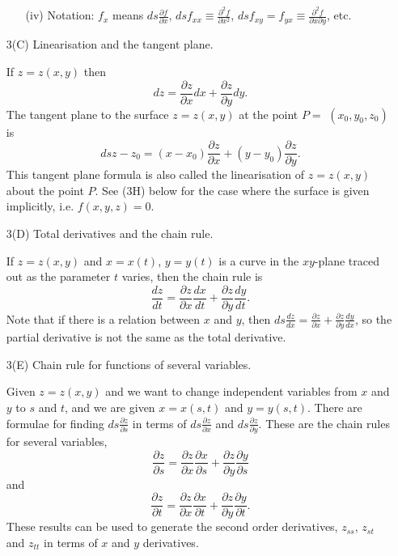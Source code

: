 \documentclass{article}
\begin{document}
\begin{enumerate}
\begin{enumerate}
\item[(iv)] Notation: $f_x$ means ${ds \frac{\partial f}{\partial x}}$,
${ds f_{xx} \equiv \frac{\partial^2 f}{\partial x^2}}$,
${ds f_{xy} = f_{yx} \equiv \frac{\partial^2 f}{\partial x \partial y}}$,
etc.

\end{enumerate}

\item[3(C)]  Linearisation and the tangent plane.

If $z= z(x,y)$ then
  $$ dz = \frac{\partial z}{\partial x} dx +
\frac{\partial z}{\partial y} dy .$$
The tangent plane to the surface $z = z(x,y)$ at the point $ P=$
$(x_0, y_0, z_0)$ is
$$ds { z-z_0 = (x-x_0) \frac{\partial z}{\partial x}
+ (y-y_0) \frac{\partial z}{\partial y} }.$$
This tangent plane
formula is also called the linearisation of $z=z(x,y)$ about
the point $P$.
See (3H) below for
the case where the surface is given implicitly, i.e. $f(x,y,z)=0$.

\item[3(D)]  Total derivatives and the chain rule.

If $z=z(x,y)$ and $x=x(t)$, $y=y(t)$ is a curve in the $xy$-plane
traced out as the parameter $t$ varies, then the chain rule is
$$ \frac{dz}{dt} = \frac{\partial z}{\partial x}
\frac{dx}{dt} + \frac{\partial z}{\partial y}\frac{dy}{dt}.$$
Note that if there is a relation between $x$ and $y$, then
$ds { \frac{dz}{dx} = \frac{\partial z}{\partial x}
+ \frac{\partial z}{\partial y} \frac{dy}{dx} }$, so the
partial derivative is not the same as the total derivative.

\item[3(E)]  Chain rule for functions of several variables.

Given $z=z(x,y)$ and we want to change independent variables from $x$ and $y$
to $s$ and $t$, and we are given $x=x(s,t)$ and $y=y(s,t)$. There
are formulae for finding ${ds \frac{\partial z}{\partial s}}$ in terms
of ${ds \frac{\partial z}{\partial x}}$ and
${ds \frac{\partial z}{\partial y}}$. These are the chain rules for
several variables,
$$ \frac{\partial z}{\partial s} =
 \frac{\partial z}{\partial x} \frac{\partial x}{\partial s}
+ \frac{\partial z}{\partial y} \frac{\partial y}{\partial s}$$
and
$$ \frac{\partial z}{\partial t} =
 \frac{\partial z}{\partial x} \frac{\partial x}{\partial t}
+ \frac{\partial z}{\partial y} \frac{\partial y}{\partial t}.$$
These results can be used to generate the second order derivatives,
$z_{ss}$, $z_{st}$ and $z_{tt}$ in terms of $x$ and $y$ derivatives.


\end{enumerate}
\end{document}
